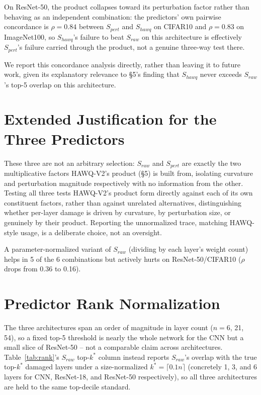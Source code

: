\documentclass{article}
\begin{document}
On ResNet-50, the product collapses toward its perturbation factor rather than behaving as an independent combination: the predictors' own pairwise concordance is $\rho=0.84$ between $S_{pert}$ and $S_{hawq}$ on CIFAR10 and $\rho=0.83$ on ImageNet100, so $S_{hawq}$'s failure to beat $S_{raw}$ on this architecture is effectively $S_{pert}$'s failure carried through the product, not a genuine three-way test there.

We report this concordance analysis directly, rather than leaving it to future work, given its explanatory relevance to \S5's finding that $S_{hawq}$ never exceeds $S_{raw}$'s top-5 overlap on this architecture.

\section{Extended Justification for the Three Predictors}
\label{app:predictor-justification}
These three are not an arbitrary selection: $S_{raw}$ and $S_{pert}$ are exactly the two multiplicative factors HAWQ-V2's product (\S5) is built from, isolating curvature and perturbation magnitude respectively with no information from the other. Testing all three tests HAWQ-V2's product form directly against each of its own constituent factors, rather than against unrelated alternatives, distinguishing whether per-layer damage is driven by curvature, by perturbation size, or genuinely by their product. Reporting the unnormalized trace, matching HAWQ-style usage, is a deliberate choice, not an oversight.

A parameter-normalized variant of $S_{raw}$ (dividing by each layer's weight count) helps in 5 of the 6 combinations but actively hurts on ResNet-50/CIFAR10 ($\rho$ drops from 0.36 to 0.16).

\section{Predictor Rank Normalization}
\label{app:normalization}
The three architectures span an order of magnitude in layer count ($n=6$, 21, 54), so a fixed top-5 threshold is nearly the whole network for the CNN but a small slice of ResNet-50 -- not a comparable claim across architectures. Table~\ref{tab:rank}'s $S_{raw}$ top-$k^*$ column instead reports $S_{raw}$'s overlap with the true top-$k^*$ damaged layers under a size-normalized $k^*=\lceil 0.1n\rceil$ (concretely 1, 3, and 6 layers for CNN, ResNet-18, and ResNet-50 respectively), so all three architectures are held to the same top-decile standard.
\end{document}
